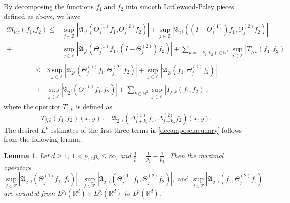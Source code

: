 \documentclass[a4paper,reqno]{amsart}
\newtheorem{lemma}[theorem]{Lemma}
\theoremstyle{definition}
\theoremstyle{remark}
\numberwithin{equation}{section}
\newcommand{\R}{{\mathbb {R}}}
\newcommand{\N}{{\mathbb N}}
\newcommand{\Z}{{\mathbb Z}}
\begin{document}
	By decomposing the functions $f_1$ and $f_2$ into smooth Littlewood-Paley pieces defined as above, we have
	\begin{align*}
		\mathfrak{M}_{lac}(f_1,f_2)\leq&\sup_{j\in\Z}\left|\mathfrak{A}_{2^j}(\Theta_j^{(1)}f_1,\Theta_j^{(2)}f_2)\right|+\sup_{j\in\Z}\left|\mathfrak{A}_{2^j}((I-\Theta_j^{(1)})f_1,\Theta_j^{(2)}f_2)\right|\\
		+&\sup_{j\in\Z}\left|\mathfrak{A}_{2^j}(\Theta_j^{(1)}f_1,(I-\Theta_j^{(2)})f_2)\right|+\sum_{{k}=(k_1,k_2)\in\N^2}\sup_{j\in\Z}\left|T_{j,{k}}(f_1,f_2)\right|
	\end{align*}
	\begin{gather}\label{decomposelacunary}
		\begin{aligned}
			\leq&3\sup_{j\in\Z}\left|\mathfrak{A}_{2^j}(\Theta_j^{(1)}f_1,\Theta_j^{(2)}f_2)\right|+\sup_{j\in\Z}\left|\mathfrak{A}_{2^j}(f_1,\Theta_j^{(2)}f_2)\right|\\
			+&\sup_{j\in\Z}\left|\mathfrak{A}_{2^j}(\Theta_j^{(1)}f_1,f_2)\right|+\sum_{{k}\in\N^2}\sup_{j\in\Z}\left|T_{j,{k}}(f_1,f_2)\right|,
		\end{aligned}
	\end{gather}
	where the operator $T_{j,{k}}$ is defined as
	\[T_{j,{k}}(f_1,f_2)(x,y):=\mathfrak{A}_{2^{-j}}(\Delta_{j+k_1}^{(1)}f_1,\Delta_{j+k_2}^{(2)}f_2)(x,y).\]
	The desired $L^p$-estimates of the first three terms in \eqref{decomposelacunary} follows from the following lemma.
	\begin{lemma}\label{HLmax}
		Let $d\geq1$, $1<p_1,p_2\leq\infty$, and $\frac{1}{p}=\frac{1}{p_1}+\frac{1}{p_2}$. Then the maximal operators
		\[\sup\limits_{j\in\Z}\left|\mathfrak{A}_{2^{-j}}(\Theta_j^{(1)}f_1,f_2)\right|,~\sup\limits_{j\in\Z}\left|\mathfrak{A}_{2^{-j}}(\Theta_j^{(1)}f_1,\Theta_j^{(2)}f_2)\right|,\text{ and }\sup\limits_{j\in\Z}\left|\mathfrak{A}_{2^{-j}}(f_1,\Theta_j^{(2)}f_2)\right|\]
		are bounded from $L^{p_1}(\R^d)\times L^{p_2}(\R^d)$ to $L^p(\R^d)$.
	\end{lemma}
\end{document}
